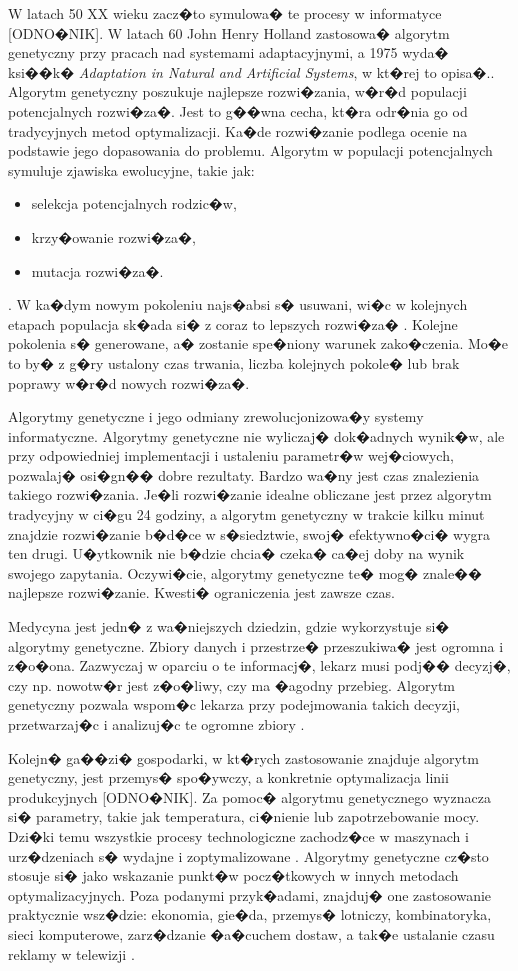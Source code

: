 W latach 50 XX wieku zacz�to symulowa� te procesy w informatyce [ODNO�NIK]. W latach 60 John Henry Holland zastosowa� algorytm genetyczny przy pracach nad systemami adaptacyjnymi, a 1975  wyda� ksi��k� \textit{Adaptation in Natural and Artificial Systems}, w kt�rej to opisa�.\cite{genetic_1}. Algorytm genetyczny poszukuje najlepsze rozwi�zania, w�r�d populacji potencjalnych rozwi�za�. Jest to g��wna cecha, kt�ra odr�nia go od tradycyjnych metod optymalizacji. Ka�de rozwi�zanie podlega ocenie na podstawie jego dopasowania do problemu. Algorytm w populacji potencjalnych symuluje zjawiska ewolucyjne, takie jak: 
\begin{itemize}
  \item selekcja potencjalnych rodzic�w,
  \item krzy�owanie rozwi�za�,
  \item mutacja rozwi�za�.
\end{itemize}.
 W ka�dym nowym pokoleniu najs�absi s� usuwani, wi�c w kolejnych etapach populacja sk�ada si� z coraz to lepszych rozwi�za� \cite{genetic_9}. Kolejne pokolenia s� generowane, a� zostanie spe�niony warunek zako�czenia. Mo�e to by� z g�ry ustalony czas trwania, liczba kolejnych pokole� lub brak poprawy w�r�d nowych rozwi�za�.

Algorytmy genetyczne i jego odmiany zrewolucjonizowa�y systemy informatyczne. Algorytmy genetyczne nie wyliczaj� dok�adnych wynik�w, ale przy odpowiedniej implementacji i ustaleniu parametr�w wej�ciowych, pozwalaj� osi�gn�� dobre rezultaty. Bardzo wa�ny jest czas znalezienia takiego rozwi�zania. Je�li rozwi�zanie idealne obliczane jest przez algorytm tradycyjny w ci�gu 24 godziny, a algorytm genetyczny w trakcie kilku minut znajdzie rozwi�zanie b�d�ce w s�siedztwie, swoj� efektywno�ci� wygra ten drugi.  U�ytkownik nie b�dzie chcia� czeka� ca�ej doby na wynik swojego zapytania. Oczywi�cie, algorytmy genetyczne te� mog� znale�� najlepsze rozwi�zanie. Kwesti� ograniczenia jest zawsze czas.

Medycyna jest jedn� z wa�niejszych dziedzin, gdzie wykorzystuje si� algorytmy genetyczne. Zbiory danych i przestrze� przeszukiwa� jest ogromna i z�o�ona. Zazwyczaj w oparciu o te informacj�, lekarz musi podj�� decyzj�, czy np. nowotw�r jest z�o�liwy, czy ma �agodny przebieg. Algorytm genetyczny pozwala wspom�c lekarza przy podejmowania takich decyzji, przetwarzaj�c i analizuj�c te ogromne zbiory \cite{genetic_2}. 

Kolejn� ga��zi� gospodarki, w kt�rych zastosowanie znajduje algorytm genetyczny, jest przemys� spo�ywczy, a konkretnie optymalizacja linii produkcyjnych [ODNO�NIK]. Za pomoc� algorytmu genetycznego wyznacza si� parametry, takie jak temperatura, ci�nienie lub zapotrzebowanie mocy. Dzi�ki temu wszystkie procesy technologiczne zachodz�ce w maszynach i urz�dzeniach s� wydajne i zoptymalizowane \cite{genetic_4}. Algorytmy genetyczne cz�sto stosuje si� jako  wskazanie punkt�w pocz�tkowych w innych metodach optymalizacyjnych. Poza podanymi przyk�adami, znajduj� one zastosowanie praktycznie wsz�dzie: ekonomia, gie�da, przemys� lotniczy, kombinatoryka, sieci komputerowe, zarz�dzanie �a�cuchem dostaw, a tak�e ustalanie czasu reklamy w telewizji \cite{genetic_5}.


